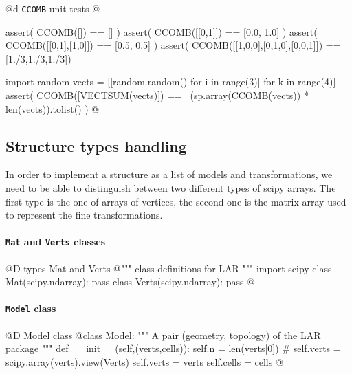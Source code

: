 \documentclass[11pt,oneside]{article}	%
\begin{document}
@d \texttt{CCOMB} unit tests
@{assert( CCOMB([]) == [] )
assert( CCOMB([[0,1]]) == [0.0, 1.0] )
assert( CCOMB([[0,1],[1,0]]) == [0.5, 0.5] )
assert( CCOMB([[1,0,0],[0,1,0],[0,0,1]]) == [1./3,1./3,1./3])

import random
vects = [[random.random() for i in range(3)] for k in range(4)]
assert( CCOMB([VECTSUM(vects)]) == \
        (sp.array(CCOMB(vects)) * len(vects)).tolist() )
@}





\subsection{Structure types handling}

In order to implement a structure as a list of models and transformations, we need to be able to distinguish between two different types of scipy arrays. The first type is the one of arrays of vertices, the second one is the matrix array used to represent the fine transformations.

\paragraph{\texttt{Mat} and \texttt{Verts} classes}
@D types Mat and Verts
@{""" class definitions for LAR """
import scipy
class Mat(scipy.ndarray): pass
class Verts(scipy.ndarray): pass
@}

\paragraph{\texttt{Model} class}
@D Model class
@{class Model:
	""" A pair (geometry, topology) of the LAR package """
	def __init__(self,(verts,cells)):
		self.n = len(verts[0])
		# self.verts = scipy.array(verts).view(Verts)
		self.verts = verts
		self.cells = cells
@}
\end{document}
